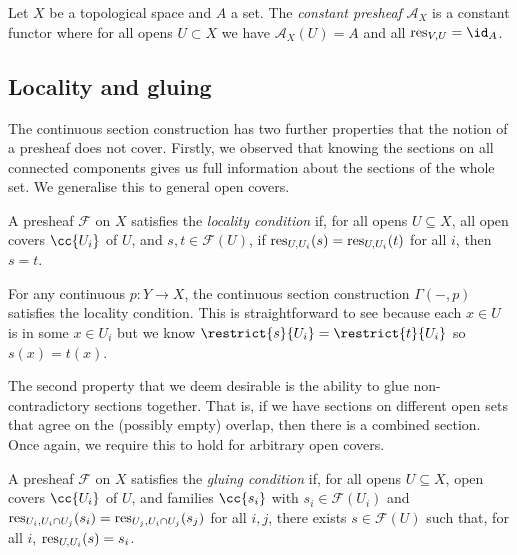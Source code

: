 \documentclass{article}
\begin{document}
\begin{example}
  Let $X$ be a topological space and $A$ a set. The \emph{constant presheaf} 
  $\mathscr A_X$ is a constant functor where for all opens $U \subset X$ 
  we have $\mathscr A_X(U) = A$ and all $\res_{V, U} = \id_A$. 
\end{example}

\subsection{Locality and gluing}

The continuous section construction has two further properties that
the notion of a presheaf does not cover. Firstly, we observed that
knowing the sections on all connected components gives us full
information about the sections of the whole set. We generalise this to
general open covers.

\begin{definition}
  A presheaf $\mathscr F$ on $X$ satisfies the \emph{locality condition}
  if, for all opens $U\subseteq X$, all open covers $\cc{U_i}$ of $U$,
  and $s,t\in\mathscr F(U)$, if $\operatorname{res}_{U,U_i}(s) = \operatorname{res}_{U,U_i}(t)$ for all $i$,
  then $s=t$.
\end{definition}

\begin{example}
  For any continuous $p:Y\to X$, the continuous section
  construction $\Gamma(-,p)$ satisfies the locality condition.
  This is straightforward to see because each $x\in U$ is in
  some $x\in U_i$ but we know $\restrict{s}{U_i}=\restrict{t}{U_i}$
  so $s(x) = t(x)$.
\end{example}

The second property that we deem desirable is the ability to glue
non-contradictory sections together. That is, if we have sections
on different open sets that agree on the (possibly empty) overlap,
then there is a combined section. Once again, we require this to
hold for arbitrary open covers.

\begin{definition}
  A presheaf $\mathscr F$ on $X$ satisfies the \emph{gluing condition}
  if, for all opens $U\subseteq X$, open covers $\cc{U_i}$ of $U$,
  and families $\cc{s_i}$ with $s_i\in\mathscr F(U_i)$ and
  $\operatorname{res}_{U_i,U_i\cap U_j}(s_i) = \operatorname{res}_{U_j,U_i\cap U_j}(s_j)$
  for all $i,j$, there exists $s\in\mathscr F(U)$ such that,
  for all $i$, $\operatorname{res}_{U,U_i}(s) = s_i$.
\end{definition}
\end{document}
